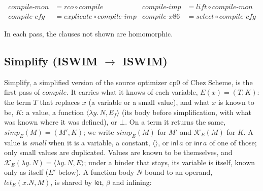 \documentclass[10pt]{article}
\theoremstyle{acmplain}
\newcommand{\key}[1]{\mathsf{#1}}
\newcommand{\pass}[1]{\mathit{#1}}
\newcommand{\lam}[1]{\lambda #1.\,}
\newcommand{\inl}{\key{inl}\,}
\newcommand{\inr}{\key{inr}\,}
\newcommand{\emptytup}{\langle\rangle}
\begin{document}
\begin{align*}
  \pass{compile\text{-}mon} &= \pass{rco} \circ \pass{compile}
  &
  \pass{compile\text{-}imp} &= \pass{lift} \circ \pass{compile\text{-}mon} \\
  \pass{compile\text{-}cfg} &= \pass{explicate} \circ \pass{compile\text{-}imp}
  &
  \pass{compile\text{-}x86} &= \pass{select} \circ \pass{compile\text{-}cfg}
\end{align*}

In each pass, the clauses not shown are homomorphic.

\subsection{Simplify (ISWIM \texorpdfstring{$\to$}{->} ISWIM)}

Simplify, a simplified version of the source optimizer cp0 of Chez Scheme,
is the first pass of $\pass{compile}$. It carries what
it knows of each variable, $E(x) = (T, K)$: the term $T$ that replaces $x$ (a
variable or a small value), and what $x$ is known to be, $K$: a value, a
function $\langle \lam{y} N, E_f \rangle$ (its body before simplification, with
what was known where it was defined), or $\bot$. On a term it returns the
same, $\pass{simp}_E(M) = (M', K)$; we write $\pass{simp}_E(M)$ for $M'$ and
$\mathcal{K}_E(M)$ for $K$. A value is
\emph{small} when it is a variable, a constant, $\emptytup$, or $\inl a$ or
$\inr a$ of one of those; only small values are duplicated. Values are known
to be themselves, and $\mathcal{K}_E(\lam{y} N) = \langle \lam{y} N, E \rangle$;
under a binder that stays, its variable is itself, known only as itself
($E'$ below). A function body $N$ bound to an operand, $\pass{let}_E(x.N, M)$,
is shared by $\key{let}$, $\beta$ and inlining:
\end{document}
